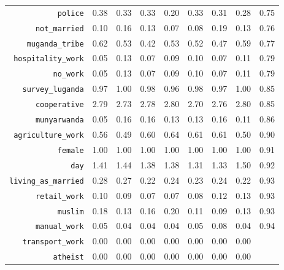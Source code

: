 \begin{longtable}{rrrrrrrrr}
  {\texttt{police}} & 0.38 & 0.33 & 0.33 & 0.20 & 0.33 & 0.31 & 0.28 & 0.75 \\ 
  {\texttt{not\_married}} & 0.10 & 0.16 & 0.13 & 0.07 & 0.08 & 0.19 & 0.13 & 0.76 \\ 
  {\texttt{muganda\_tribe}} & 0.62 & 0.53 & 0.42 & 0.53 & 0.52 & 0.47 & 0.59 & 0.77 \\ 
  {\texttt{hospitality\_work}} & 0.05 & 0.13 & 0.07 & 0.09 & 0.10 & 0.07 & 0.11 & 0.79 \\ 
  {\texttt{no\_work}} & 0.05 & 0.13 & 0.07 & 0.09 & 0.10 & 0.07 & 0.11 & 0.79 \\ 
  {\texttt{survey\_luganda}} & 0.97 & 1.00 & 0.98 & 0.96 & 0.98 & 0.97 & 1.00 & 0.85 \\ 
  {\texttt{cooperative}} & 2.79 & 2.73 & 2.78 & 2.80 & 2.70 & 2.76 & 2.80 & 0.85 \\ 
  {\texttt{munyarwanda}} & 0.05 & 0.16 & 0.16 & 0.13 & 0.13 & 0.16 & 0.11 & 0.86 \\ 
  {\texttt{agriculture\_work}} & 0.56 & 0.49 & 0.60 & 0.64 & 0.61 & 0.61 & 0.50 & 0.90 \\ 
  {\texttt{female}} & 1.00 & 1.00 & 1.00 & 1.00 & 1.00 & 1.00 & 1.00 & 0.91 \\ 
  {\texttt{day}} & 1.41 & 1.44 & 1.38 & 1.38 & 1.31 & 1.33 & 1.50 & 0.92 \\ 
  {\texttt{living\_as\_married}} & 0.28 & 0.27 & 0.22 & 0.24 & 0.23 & 0.24 & 0.22 & 0.93 \\ 
  {\texttt{retail\_work}} & 0.10 & 0.09 & 0.07 & 0.07 & 0.08 & 0.12 & 0.13 & 0.93 \\ 
  {\texttt{muslim}} & 0.18 & 0.13 & 0.16 & 0.20 & 0.11 & 0.09 & 0.13 & 0.93 \\ 
  {\texttt{manual\_work}} & 0.05 & 0.04 & 0.04 & 0.04 & 0.05 & 0.08 & 0.04 & 0.94 \\ 
  {\texttt{transport\_work}} & 0.00 & 0.00 & 0.00 & 0.00 & 0.00 & 0.00 & 0.00 &  \\ 
  {\texttt{atheist}} & 0.00 & 0.00 & 0.00 & 0.00 & 0.00 & 0.00 & 0.00 &  \\ 
   \hline
\hline
\end{longtable}
